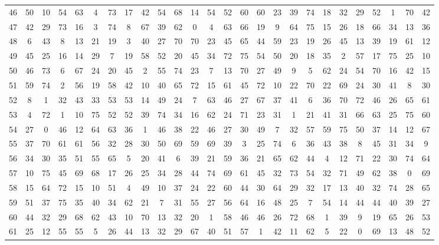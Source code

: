 \begin{table}
\begin{tabular}{c c c c c c c c c c c c c c c c c c c c c c c c c c }
46 & 50 & 10 & 54 & 63 & 4 & 73 & 17 & 42 & 54 & 68 & 14 & 54 & 52 & 60 & 60 & 23 & 39 & 74 & 18 & 32 & 29 & 52 & 1 & 70 & 42 \\
47 & 42 & 29 & 73 & 16 & 3 & 74 & 8 & 67 & 39 & 62 & 0 & 4 & 63 & 66 & 19 & 9 & 64 & 75 & 15 & 26 & 18 & 66 & 34 & 13 & 36 \\
48 & 6 & 43 & 8 & 13 & 21 & 19 & 3 & 40 & 27 & 70 & 70 & 23 & 45 & 65 & 44 & 59 & 23 & 19 & 26 & 45 & 13 & 39 & 19 & 61 & 12 \\
49 & 45 & 25 & 16 & 14 & 29 & 7 & 19 & 58 & 52 & 20 & 45 & 34 & 72 & 75 & 54 & 50 & 20 & 18 & 35 & 2 & 57 & 17 & 75 & 25 & 10 \\
50 & 46 & 73 & 6 & 67 & 24 & 20 & 45 & 2 & 55 & 74 & 23 & 7 & 13 & 70 & 27 & 49 & 9 & 5 & 62 & 24 & 54 & 70 & 16 & 42 & 15 \\
51 & 59 & 74 & 2 & 56 & 19 & 58 & 42 & 10 & 40 & 65 & 72 & 15 & 61 & 45 & 72 & 10 & 22 & 70 & 22 & 69 & 24 & 30 & 41 & 8 & 30 \\
52 & 8 & 1 & 32 & 43 & 33 & 53 & 53 & 14 & 49 & 24 & 7 & 63 & 46 & 27 & 67 & 37 & 41 & 6 & 36 & 70 & 72 & 46 & 26 & 65 & 61 \\
53 & 4 & 72 & 1 & 10 & 75 & 52 & 52 & 39 & 74 & 34 & 16 & 62 & 24 & 71 & 23 & 31 & 1 & 21 & 41 & 31 & 66 & 63 & 25 & 75 & 60 \\
54 & 27 & 0 & 46 & 12 & 64 & 63 & 36 & 1 & 46 & 38 & 22 & 46 & 27 & 30 & 49 & 7 & 32 & 57 & 59 & 75 & 50 & 37 & 14 & 12 & 67 \\
55 & 37 & 70 & 61 & 61 & 56 & 32 & 28 & 30 & 50 & 69 & 59 & 69 & 39 & 3 & 25 & 74 & 6 & 36 & 43 & 38 & 8 & 45 & 31 & 34 & 9 \\
56 & 34 & 30 & 35 & 51 & 55 & 65 & 5 & 20 & 41 & 6 & 39 & 21 & 59 & 36 & 21 & 65 & 62 & 44 & 4 & 12 & 71 & 22 & 30 & 74 & 64 \\
57 & 10 & 75 & 45 & 69 & 68 & 17 & 26 & 25 & 34 & 28 & 44 & 74 & 69 & 61 & 45 & 32 & 73 & 54 & 32 & 71 & 49 & 62 & 38 & 0 & 69 \\
58 & 15 & 64 & 72 & 15 & 10 & 51 & 4 & 49 & 10 & 37 & 24 & 22 & 60 & 44 & 30 & 64 & 29 & 32 & 17 & 13 & 40 & 32 & 74 & 28 & 65 \\
59 & 51 & 37 & 75 & 35 & 40 & 34 & 62 & 21 & 7 & 31 & 55 & 27 & 56 & 64 & 16 & 48 & 25 & 7 & 54 & 14 & 44 & 44 & 40 & 39 & 27 \\
60 & 44 & 32 & 29 & 68 & 62 & 43 & 10 & 70 & 13 & 32 & 20 & 1 & 58 & 46 & 46 & 26 & 72 & 68 & 1 & 39 & 9 & 19 & 65 & 26 & 53 \\
61 & 25 & 12 & 55 & 55 & 5 & 26 & 44 & 13 & 32 & 29 & 67 & 40 & 51 & 57 & 1 & 42 & 11 & 62 & 5 & 22 & 0 & 69 & 13 & 48 & 52 \\

\end{tabular}
\end{table}
